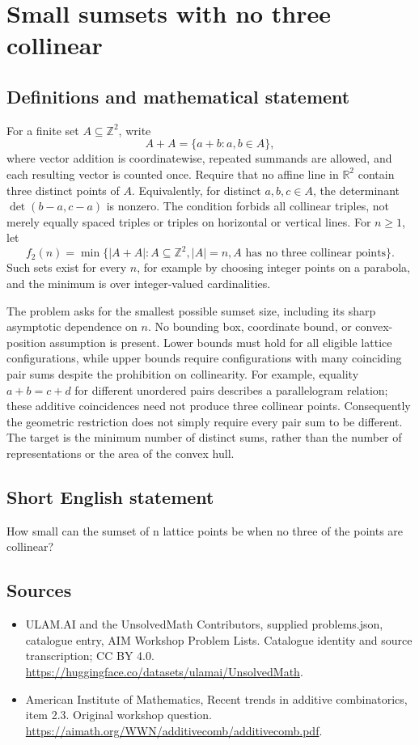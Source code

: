 \documentclass[11pt,a4paper]{article}
\begin{document}
\section*{Small sumsets with no three collinear}\label{statement}

\subsection{Definitions and mathematical statement}
For a finite set $A\subseteq\mathbb Z^2$, write
\[
                        A+A=\{a+b:a,b\in A\},
\]
where vector addition is coordinatewise, repeated summands are allowed,
and each resulting vector is counted once. Require that no affine
line in $\mathbb R^2$ contain three distinct points of $A$.
Equivalently, for distinct $a,b,c\in A$, the determinant
$\det(b-a,c-a)$ is nonzero. The condition forbids all collinear
triples, not merely equally spaced triples or triples on horizontal
or vertical lines.
For $n\ge1$, let
\[
 f_2(n)=\min\{|A+A|:A\subseteq\mathbb Z^2, |A|=n,
                                  A\text{ has no three collinear points}\}.
\]
Such sets exist for every $n$, for example by choosing integer points
on a parabola, and the minimum is over integer-valued cardinalities.

The problem asks for the smallest possible sumset size, including its
sharp asymptotic dependence on $n$. No bounding box, coordinate bound,
or convex-position assumption is present. Lower bounds must hold for
all eligible lattice configurations, while upper bounds require
configurations with many coinciding pair sums despite the prohibition
on collinearity.
For example, equality $a+b=c+d$ for different unordered pairs describes
a parallelogram relation; these additive coincidences need not produce
three collinear points. Consequently the geometric restriction does
not simply require every pair sum to be different. The target is the
minimum number of distinct sums, rather than the number of representations
or the area of the convex hull.
\subsection{Short English statement}
How small can the sumset of n lattice points be when no three of the points are collinear?
\subsection{Sources}
\begin{itemize}
\item[S1] ULAM.AI and the UnsolvedMath Contributors, supplied problems.json, catalogue entry, AIM Workshop Problem Lists. Catalogue identity and source transcription; CC BY 4.0.
\url{https://huggingface.co/datasets/ulamai/UnsolvedMath}.
\item[S2] American Institute of Mathematics, Recent trends in additive combinatorics, item 2.3. Original workshop question.
\url{https://aimath.org/WWN/additivecomb/additivecomb.pdf}.
\end{itemize}
\end{document}
